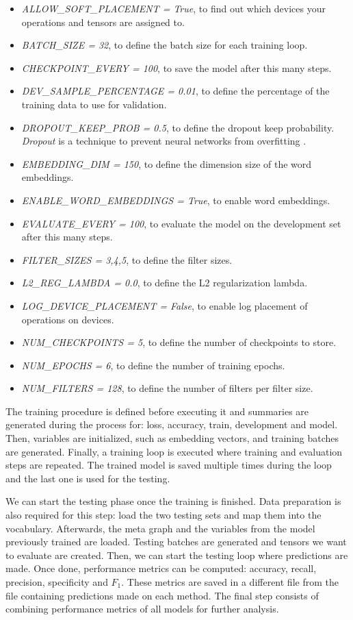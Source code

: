 \begin{itemize}
\item \textit{ALLOW\_SOFT\_PLACEMENT = True}, to find out which devices your operations and tensors are assigned to.
\item \textit{BATCH\_SIZE = 32}, to define the batch size for each training loop.
\item \textit{CHECKPOINT\_EVERY = 100}, to save the model after this many steps.
\item \textit{DEV\_SAMPLE\_PERCENTAGE = 0.01}, to define the percentage of the training data to use for validation.
\item \textit{DROPOUT\_KEEP\_PROB = 0.5}, to define the dropout keep probability. \textit{Dropout} is a technique to prevent neural networks from overfitting \citep{srivastava2014dropout}. 
\item \textit{EMBEDDING\_DIM = 150}, to define the dimension size of the word embeddings.
\item \textit{ENABLE\_WORD\_EMBEDDINGS = True}, to enable word embeddings.
\item \textit{EVALUATE\_EVERY = 100}, to evaluate the model on the development set after this many steps.
\item \textit{FILTER\_SIZES = 3,4,5}, to define the filter sizes.
\item \textit{L2\_REG\_LAMBDA = 0.0}, to define the L2 regularization lambda.
\item \textit{LOG\_DEVICE\_PLACEMENT = False}, to enable log placement of operations on devices.
\item \textit{NUM\_CHECKPOINTS = 5}, to define the number of checkpoints to store.
\item \textit{NUM\_EPOCHS = 6}, to define the number of training epochs.
\item \textit{NUM\_FILTERS = 128}, to define the number of filters per filter size.
\end{itemize}

The training procedure is defined before executing it and summaries are generated during the process for: loss, accuracy, train, development and model. Then, variables are initialized, such as embedding vectors, and training batches are generated. Finally, a training loop is executed where training and evaluation steps are repeated. The trained model is saved multiple times during the loop and the last one is used for the testing. 

We can start the testing phase once the training is finished. Data preparation is also required for this step: load the two testing sets and map them into the vocabulary. Afterwards, the meta graph and the variables from the model previously trained are loaded. Testing batches are generated and tensors we want to evaluate are created. Then, we can start the testing loop where predictions are made. Once done, performance metrics can be computed: accuracy, recall, precision, specificity and $F_1$. These metrics are saved in a different file from the file containing predictions made on each method. The final step consists of combining performance metrics of all models for further analysis.

